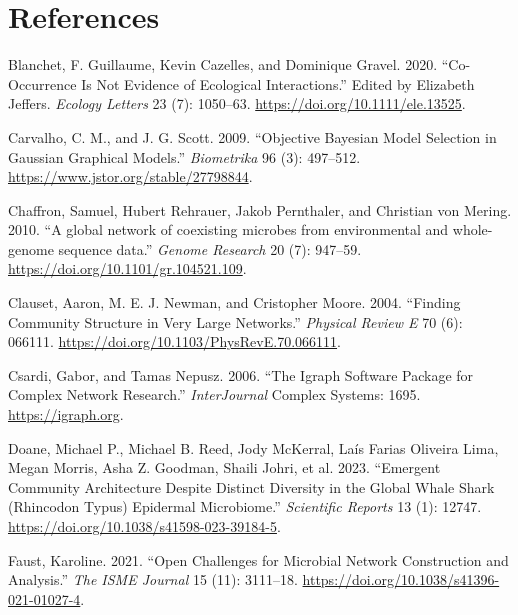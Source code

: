 \documentclass[
  a4paper,
]{article}
\newlength{\cslhangindent}
\newlength{\cslentryspacingunit} %
\newenvironment{CSLReferences}[2] %
 {%
  \setlength{\parindent}{0pt}
  \ifodd #1
  \let\oldpar\par
  \def\par{\hangindent=\cslhangindent\oldpar}
  \fi
  \setlength{\parskip}{#2\cslentryspacingunit}
 }%
 {}
\begin{document}
\newpage

\hypertarget{references}{%
\section*{References}\label{references}}

\hypertarget{refs}{}
\begin{CSLReferences}{1}{0}
\leavevmode{}%
Blanchet, F. Guillaume, Kevin Cazelles, and Dominique Gravel. 2020.
{``Co{-}Occurrence Is Not Evidence of Ecological Interactions.''} Edited
by Elizabeth Jeffers. \emph{Ecology Letters} 23 (7): 1050--63.
\url{https://doi.org/10.1111/ele.13525}.

\leavevmode{}%
Carvalho, C. M., and J. G. Scott. 2009. {``Objective Bayesian Model
Selection in Gaussian Graphical Models.''} \emph{Biometrika} 96 (3):
497--512. \url{https://www.jstor.org/stable/27798844}.

\leavevmode{}%
Chaffron, Samuel, Hubert Rehrauer, Jakob Pernthaler, and Christian von
Mering. 2010. {``A global network of coexisting microbes from
environmental and whole-genome sequence data.''} \emph{Genome Research}
20 (7): 947--59. \url{https://doi.org/10.1101/gr.104521.109}.

\leavevmode{}%
Clauset, Aaron, M. E. J. Newman, and Cristopher Moore. 2004. {``Finding
Community Structure in Very Large Networks.''} \emph{Physical Review E}
70 (6): 066111. \url{https://doi.org/10.1103/PhysRevE.70.066111}.

\leavevmode{}%
Csardi, Gabor, and Tamas Nepusz. 2006. {``The Igraph Software Package
for Complex Network Research.''} \emph{InterJournal} Complex Systems:
1695. \url{https://igraph.org}.

\leavevmode{}%
Doane, Michael P., Michael B. Reed, Jody McKerral, Laís Farias Oliveira
Lima, Megan Morris, Asha Z. Goodman, Shaili Johri, et al. 2023.
{``Emergent Community Architecture Despite Distinct Diversity in the
Global Whale Shark (Rhincodon Typus) Epidermal Microbiome.''}
\emph{Scientific Reports} 13 (1): 12747.
\url{https://doi.org/10.1038/s41598-023-39184-5}.

\leavevmode{}%
Faust, Karoline. 2021. {``Open Challenges for Microbial Network
Construction and Analysis.''} \emph{The ISME Journal} 15 (11): 3111--18.
\url{https://doi.org/10.1038/s41396-021-01027-4}.


\end{CSLReferences}
\end{document}
